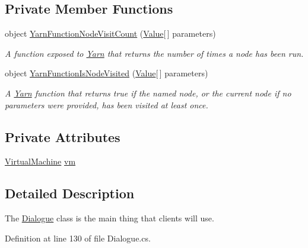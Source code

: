\subsection*{Private Member Functions}
\begin{DoxyCompactItemize}
\item 
object \hyperlink{a00088_a10c9f22d3f55e74f091cd6069c431094}{Yarn\-Function\-Node\-Visit\-Count} (\hyperlink{a00165}{Value}\mbox{[}$\,$\mbox{]} parameters)
\begin{DoxyCompactList}\small\item\em A function exposed to \hyperlink{a00048}{Yarn} that returns the number of times a node has been run. \end{DoxyCompactList}\item 
object \hyperlink{a00088_a1ab129bd84381928531d503304ca08d6}{Yarn\-Function\-Is\-Node\-Visited} (\hyperlink{a00165}{Value}\mbox{[}$\,$\mbox{]} parameters)
\begin{DoxyCompactList}\small\item\em A \hyperlink{a00048}{Yarn} function that returns true if the named node, or the current node if no parameters were provided, has been visited at least once. \end{DoxyCompactList}\end{DoxyCompactItemize}
\subsection*{Private Attributes}
\begin{DoxyCompactItemize}
\item 
\hyperlink{a00145}{Virtual\-Machine} \hyperlink{a00088_a8c1319357a9df6cff051328fb33224c7}{vm}
\end{DoxyCompactItemize}


\subsection{Detailed Description}
The \hyperlink{a00088}{Dialogue} class is the main thing that clients will use. 

Definition at line 130 of file Dialogue.\-cs.



